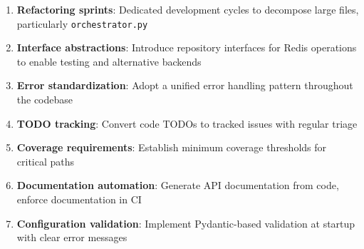 \begin{enumerate}
    \item \textbf{Refactoring sprints}: Dedicated development cycles to decompose large files, particularly \texttt{orchestrator.py}
    \item \textbf{Interface abstractions}: Introduce repository interfaces for Redis operations to enable testing and alternative backends
    \item \textbf{Error standardization}: Adopt a unified error handling pattern throughout the codebase
    \item \textbf{TODO tracking}: Convert code TODOs to tracked issues with regular triage
    \item \textbf{Coverage requirements}: Establish minimum coverage thresholds for critical paths
    \item \textbf{Documentation automation}: Generate API documentation from code, enforce documentation in CI
    \item \textbf{Configuration validation}: Implement Pydantic-based validation at startup with clear error messages
\end{enumerate}

